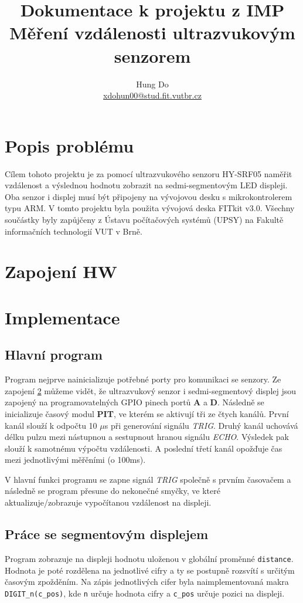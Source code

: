 \documentclass[a4paper,11pt]{article}
\title{Dokumentace k projektu z IMP \\
        \large Měření vzdálenosti ultrazvukovým senzorem}
\author{Hung Do \\ \href{mailto:xdohun00@stud.fit.vutbr.cz}{xdohun00@stud.fit.vutbr.cz}}
\begin{document}
    \maketitle
    \thispagestyle{empty}
    \newpage
    \tableofcontents
    \newpage
    \section{Popis problému}
    Cílem tohoto projektu je za pomocí ultrazvukového senzoru HY-SRF05 naměřit vzdálenost a výslednou hodnotu zobrazit na 
    sedmi-segmentovým LED displeji. Oba senzor i displej musí být připojeny na vývojovou desku s mikrokontrolerem typu ARM.
    V tomto projektu byla použita vývojová deska FITkit v3.0. Všechny součástky byly zapůjčeny z Ústavu počítačových systémů (UPSY) na 
    Fakultě informačních technologií VUT v Brně.

    \section{Zapojení HW}
    \label{sec:circuit_diagram}

    \section{Implementace}
    \subsection{Hlavní program}
    Program nejprve nainicializuje potřebné porty pro komunikaci se senzory. Ze zapojení \ref{sec:circuit_diagram} můžeme vidět,
    že ultrazvukový senzor i sedmi-segmentový displej jsou zapojený na programovatelných GPIO pinech portů \textbf{A} a \textbf{D}.
    Následně se inicializuje časový modul \textbf{PIT}, ve kterém se aktivují tři ze čtych kanálů. První kanál slouží k odpočtu 10 $\mu$s
    při generování signálu \emph{TRIG}. Druhý kanál uchovává délku pulzu mezi nástupnou a sestupnout hranou signálu \emph{ECHO}. Výsledek pak slouží
    k samotnému výpočtu vzdálenosti. A poslední třetí kanál opožďuje čas mezi jednotlivými měřěními (o 100ms).

    V hlavní funkci programu se zapne signál \emph{TRIG} společně s prvním časovačem a následně se program přesune do
    nekonečné smyčky, ve které aktualizuje/zobrazuje vypočítanou vzdálenost na displeji.

    \subsection{Práce se segmentovým displejem}
    Program zobrazuje na displeji hodnotu uloženou v globální proměnné \verb|distance|. Hodnota je poté rozdělena na jednotlivé cifry a ty
    se postupně rozsvítí s určitým časovým zpožděním. Na zápis jednotlivých cifer byla naimplementovaná makra \verb|DIGIT_n(c_pos)|, kde \verb|n|
    určuje hodnota cifry a \verb|c_pos| určuje pozici na displeji.
\end{document}
